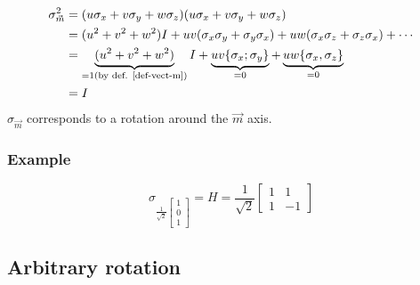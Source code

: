 \documentclass{article}
\begin{document}
\begin{equation}
    \begin{aligned}
        \sigma_{\vec{m}}^2
            & = (u\sigma_x + v\sigma_y + w\sigma_z)(u\sigma_x + v\sigma_y + w\sigma_z) \\
            & = (u^2 + v^2 + w^2)I + uv (\sigma_x\sigma_y + \sigma_y\sigma_x) + uw (\sigma_x\sigma_z + \sigma_z\sigma_x) + \cdots \\
            & = \underbrace{(u^2 + v^2 + w^2)}_{=1 (\text{by def. \ref{def-vect-m}})}I +
                \underbrace{uv\{\sigma_x; \sigma_y\}}_{=0} + \underbrace{uw\{\sigma_x, \sigma_z\}}_{=0} \\
            & = I
    \end{aligned}
\end{equation}
$\sigma_{\vec{m}}$ corresponds to a rotation around the $\vec{m}$ axis.

\subsubsection*{Example}
$$
\sigma_{\frac{1}{\sqrt{2}}\begin{bmatrix}1\\0\\1\end{bmatrix}} = H = \frac{1}{\sqrt{2}}
\begin{bmatrix}
    1 & 1 \\ 1 & -1
\end{bmatrix}
$$

\subsection{Arbitrary rotation}
\end{document}
